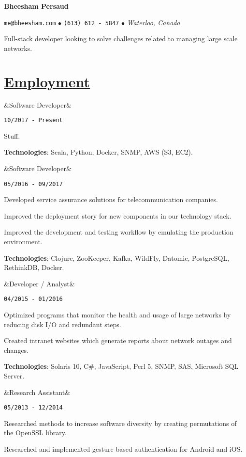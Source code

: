 \documentclass[11pt]{article} %
\newcommand{\heading}[1]{
    \section*{\uline{\hfill #1 }} %
}
\newcommand{\squish}{
\setlength{\itemsep}{0.2pt}
    \setlength{\parskip}{0pt} %
    \setlength{\parsep}{0.2pt}
}
\newcommand{\when}[1]{ %
    \hfill \texttt{#1}
}
\newcommand{\experience}[3]{ %
    \ifx&#2&
\item[{#1}]
    \else
\item[{#1}, \emph{#2}]
    \fi
    \when{#3}
}
\newcommand{\contact}[3]{
    \centerline{ \large \texttt{#1} $\bullet$ \texttt{#2} $\bullet$ \emph{#3} }
    \vspace{0.1in}
}
\newcommand{\technologies}[1]{
    {\small \textbf{Technologies}: #1.}
}
\begin{document}
\centerline{{\huge \bf Bheesham Persaud}}
\bigskip

\contact{me@bheesham.com}
        {(613) 612 - 5847}
        {Waterloo, Canada}

Full-stack developer looking to solve challenges related to managing large
scale networks.

\heading{Employment}%

\begin{description}
        \squish

        \experience{Auvik Networks}
                   {Software Developer}
                   {10/2017 - Present}

        Stuff.

        \technologies{Scala, Python, Docker, SNMP, AWS (S3, EC2)}

        \experience{CENX}
                   {Software Developer}
                   {05/2016 - 09/2017}

        Developed service assurance solutions for telecommunication companies.

        Improved the deployment story for new components in our technology
        stack.

        Improved the development and testing workflow by emulating the
        production environment.

        \technologies{Clojure, ZooKeeper, Kafka, WildFly, Datomic, PostgreSQL,
        RethinkDB, Docker}

        \experience{Shared Services Canada}
                   {Developer / Analyst}
                   {04/2015 - 01/2016}

        Optimized programs that monitor the health and usage of large networks
        by reducing disk I/O and redundant steps.
        
        Created intranet websites which generate reports about network outages
        and changes.
        
        \technologies{Solaris 10, C\#, JavaScript, Perl 5, SNMP, SAS,
        Microsoft SQL Server}

        \experience{Carleton University}
                   {Research Assistant}
                   {05/2013 - 12/2014}

        Researched methods to increase software diversity by creating
        permutations of the OpenSSL library.

        Researched and implemented gesture based authentication for Android and
        iOS.
        

\end{description}
\end{document}
